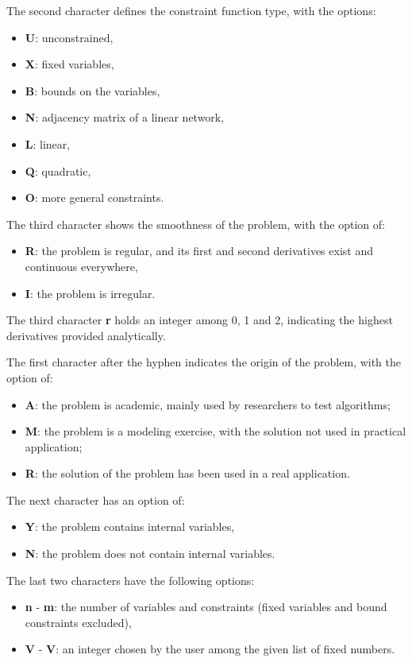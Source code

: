 The second character defines the constraint function type, with the options: 
\begin{itemize}  \itemsep -8pt 
\item  \textbf{U}: unconstrained,
\item  \textbf{X}: fixed variables, 
\item  \textbf{B}: bounds on the variables,
\item  \textbf{N}: adjacency matrix of a linear network,
\item  \textbf{L}: linear, 
\item  \textbf{Q}: quadratic,
\item  \textbf{O}: more general constraints. 
\end{itemize}

The third character shows the smoothness of the problem, with the option of:
\begin{itemize}  \itemsep -8pt 
\item \textbf{R}: the problem is regular, and its first and second derivatives exist and continuous everywhere,
\item \textbf{I}: the problem is irregular.
\end{itemize}

The third character \textbf{r} holds an integer among 0, 1 and 2, indicating the highest derivatives provided analytically.

The first character after the hyphen indicates the origin of the problem, with the option of:
\begin{itemize}  \itemsep -8pt 
\item  \textbf{A}: the problem is academic, mainly used by researchers to test algorithms; 
\item  \textbf{M}: the problem is a modeling exercise, with the solution not used in practical application; 
\item  \textbf{R}: the solution of the problem has been used in a real application.  
\end{itemize}

The next character has an option of: 
\begin{itemize}  \itemsep -8pt 
\item \textbf{Y}: the problem contains internal variables, 
\item \textbf{N}: the problem does not contain internal variables. 
\end{itemize}

The last two characters have the following options:
\begin{itemize}  \itemsep -8pt 
\item \textbf{n} - \textbf{m}: the number of variables and constraints (fixed variables and bound constraints excluded), 
\item \textbf{V} - \textbf{V}: an integer chosen by the user among the given list of fixed numbers.
\end{itemize}
